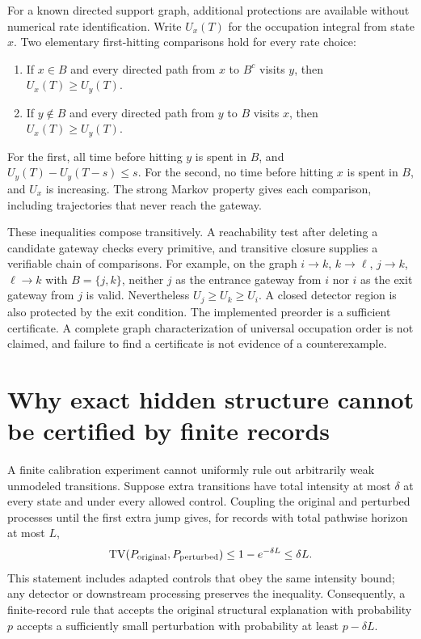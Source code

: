 For a known directed support graph, additional protections are available without
numerical rate identification. Write $U_x(T)$ for the occupation integral from
state $x$. Two elementary first-hitting comparisons hold for every rate choice:
\begin{enumerate}
\item If $x\in B$ and every directed path from $x$ to $B^c$ visits $y$, then
      $U_x(T)\geq U_y(T)$.
\item If $y\notin B$ and every directed path from $y$ to $B$ visits $x$, then
      $U_x(T)\geq U_y(T)$.
\end{enumerate}
For the first, all time before hitting $y$ is spent in $B$, and
$U_y(T)-U_y(T-s)\leq s$. For the second, no time before hitting $x$ is spent in
$B$, and $U_x$ is increasing. The strong Markov property gives each comparison,
including trajectories that never reach the gateway.

These inequalities compose transitively. A reachability test after deleting a
candidate gateway checks every primitive, and transitive closure supplies a
verifiable chain of comparisons. For example, on the graph
$i\to k$, $k\to\ell$, $j\to k$, $\ell\to k$ with $B=\{j,k\}$,
neither $j$ as the entrance gateway from $i$ nor $i$ as the exit gateway from
$j$ is valid. Nevertheless $U_j\geq U_k\geq U_i$. A closed detector region is
also protected by the exit condition. The implemented preorder is a sufficient
certificate. A complete graph characterization of universal occupation order
is not claimed, and failure to find a certificate is not evidence of a
counterexample.

\section{Why exact hidden structure cannot be certified by finite records}

A finite calibration experiment cannot uniformly rule out arbitrarily weak
unmodeled transitions. Suppose extra transitions have total intensity at most
$\delta$ at every state and under every allowed control. Coupling the original
and perturbed processes until the first extra jump gives, for records with total
pathwise horizon at most $L$,
\[
 \operatorname{TV}(P_{\rm original},P_{\rm perturbed})
 \leq1-e^{-\delta L}\leq\delta L.
\]
This statement includes adapted controls that obey the same intensity bound;
any detector or downstream processing preserves the inequality. Consequently,
a finite-record rule that accepts the original structural explanation with
probability $p$ accepts a sufficiently small perturbation with probability at
least $p-\delta L$.

